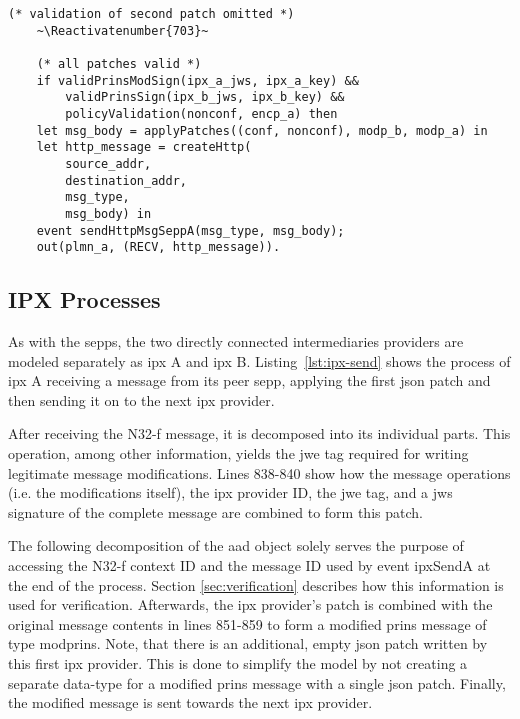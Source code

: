 \begin{lstlisting}[caption={Definition of the receiving N32-f signaling transmission process},label={lst:n32f-recv},firstnumber=846]
    (* validation of second patch omitted *)
    ~\Reactivatenumber{703}~

    (* all patches valid *)
    if validPrinsModSign(ipx_a_jws, ipx_a_key) &&
        validPrinsSign(ipx_b_jws, ipx_b_key) &&
        policyValidation(nonconf, encp_a) then
    let msg_body = applyPatches((conf, nonconf), modp_b, modp_a) in
    let http_message = createHttp(
        source_addr,
        destination_addr,
        msg_type,
        msg_body) in
    event sendHttpMsgSeppA(msg_type, msg_body);
    out(plmn_a, (RECV, http_message)).
\end{lstlisting}

\subsection{IPX Processes}

As with the \glspl{sepp}, the two directly connected intermediaries providers are modeled separately as \gls{ipx} A and \gls{ipx} B.
Listing~\ref{lst:ipx-send} shows the process of \gls{ipx} A receiving a message from its peer \gls{sepp}, applying the first \gls{json} patch and then sending it on to the next \gls{ipx} provider.

After receiving the N32-f message, it is decomposed into its individual parts.
This operation, among other information, yields the \gls{jwe} tag required for writing legitimate message modifications.
Lines 838-840 show how the message operations (i.e. the modifications itself), the \gls{ipx} provider ID, the \gls{jwe} tag, and a \gls{jws} signature of the complete message are combined to form this patch.

The following decomposition of the \gls{aad} object solely serves the purpose of accessing the N32-f context ID and the message ID used by event {\sffamily ipxSendA} at the end of the process.
Section \ref{sec:verification} describes how this information is used for verification.
Afterwards, the \gls{ipx} provider's patch is combined with the original message contents in lines 851-859 to form a modified \gls{prins} message of type {\sffamily modprins}.
Note, that there is an additional, empty \gls{json} patch written by this first \gls{ipx} provider.
This is done to simplify the model by not creating a separate data-type for a modified \gls{prins} message with a single \gls{json} patch.
Finally, the modified message is sent towards the next \gls{ipx} provider.

